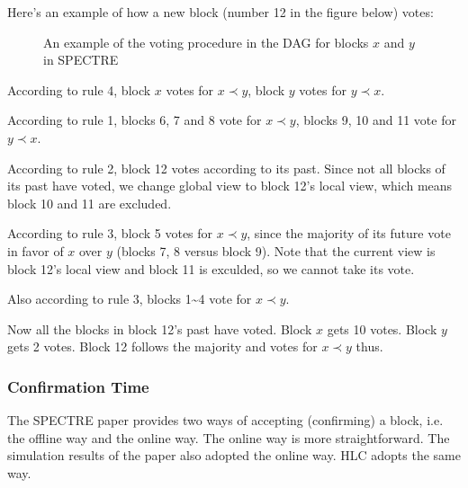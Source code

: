 \documentclass[a4paper,11pt]{article}
\begin{document}
Here's an example of how a new block (number 12 in the figure below) votes:

\begin{figure}[h]
	\centerline{%
	}
\caption{An example of the voting procedure in the DAG for blocks $x$ and $y$ in SPECTRE}
\end{figure}

According to rule 4, block $x$ votes for $x \prec y$, block $y$ votes for $y
\prec x$.

According to rule 1, blocks 6, 7 and 8 vote for $x \prec y$, blocks 9, 10 and 11
vote for $y \prec x$.

According to rule 2, block 12 votes according to its past. Since not all blocks
of its past have voted, we change global view to block 12's local view, which
means block 10 and 11 are excluded.

According to rule 3, block 5 votes for $x \prec y$, since the majority of its
future vote in favor of $x$ over $y$ (blocks 7, 8 versus block 9). Note that the
current view is block 12's local view and block 11 is exculded, so we cannot
take its vote.

Also according to rule 3, blocks 1\textasciitilde4 vote for $x \prec y$.

Now all the blocks in block 12's past have voted. Block $x$ gets 10 votes. Block
$y$ gets 2 votes. Block 12 follows the majority and votes for $x \prec y$ thus.

\subsubsection{Confirmation Time}

The SPECTRE paper provides two ways of accepting (confirming) a block, i.e. the
offline way and the online way. The online way is more straightforward. The
simulation results of the paper also adopted the online way. HLC adopts the same
way.
\end{document}
